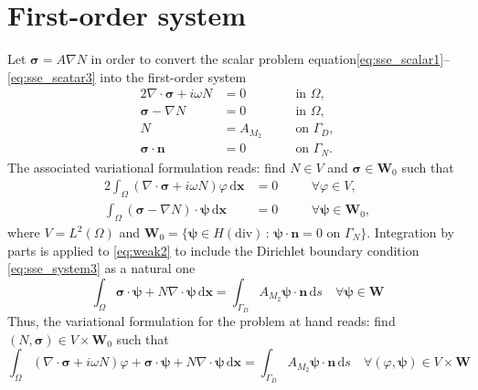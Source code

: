 \documentclass[11pt,a4paper]{article}
\begin{document}
\section*{First-order system}
Let $\boldsymbol{\sigma}=A\nabla N$ in order to convert the scalar problem equation\eqref{eq:sse_scalar1}--\eqref{eq:sse_scatar3} into the first-order system
\begin{alignat}{2}
\nabla\cdot\boldsymbol{\sigma}+i\omega N&=0  \quad && \text{in } \Omega,
\label{eq:sse_system1}\\
\boldsymbol{\sigma}-\nabla N&=0 \quad && \text{in } \Omega,\\
N&=A_{M_2} \quad && \text{on } \Gamma_D,
\label{eq:sse_system3}\\
\boldsymbol{\sigma}\cdot\mathbf{n}&=0 \quad && \text{on } \Gamma_N.
\label{eq:sse_system4}
\end{alignat}
The associated variational formulation reads: find $N\in V$ and $\boldsymbol{\sigma}\in\mathbf{W}_0$ such that 
\begin{alignat}{2}
\int_\Omega\left(\nabla\cdot\boldsymbol{\sigma}+i\omega N\right)\varphi\,\mathrm{d}\mathbf{x}&=0 \quad && \forall \varphi\in V,
\label{eq:weak1}\\
\int_\Omega\left(\boldsymbol{\sigma}-\nabla N\right)\cdot\boldsymbol{\psi}\,\mathrm{d}\mathbf{x}&=0 \quad && \forall \boldsymbol{\psi}\in \mathbf{W}_0,
\label{eq:weak2}
\end{alignat}
where $V=L^2(\Omega)$ and $\mathbf{W}_0=\{\boldsymbol{\psi}\in H(\text{div})\,:\,\boldsymbol{\psi}\cdot\mathbf{n}=0 \text{ on }\Gamma_N\}$.
Integration by parts is applied to \eqref{eq:weak2} to include the Dirichlet boundary condition \eqref{eq:sse_system3} as a natural one
\begin{equation}
\int_\Omega\boldsymbol{\sigma}\cdot\boldsymbol{\psi}+N\nabla\cdot\boldsymbol{\psi}\,\mathrm{d}\mathbf{x}=\int_{\Gamma_D} A_{M_2}\boldsymbol{\psi}\cdot\mathbf{n}\,\mathrm{d}s \quad \forall \boldsymbol{\psi}\in \mathbf{W}
\end{equation}
Thus, the variational formulation for the problem at hand reads: find $(N,\boldsymbol{\sigma})\in V\times\mathbf{W}_0$ such that
\begin{equation}
\int_\Omega\left(\nabla\cdot\boldsymbol{\sigma}+i\omega N\right)\varphi+\boldsymbol{\sigma}\cdot\boldsymbol{\psi}+N\nabla\cdot\boldsymbol{\psi}\,\mathrm{d}\mathbf{x}=\int_{\Gamma_D} A_{M_2}\boldsymbol{\psi}\cdot\mathbf{n}\,\mathrm{d}s \quad \forall (\varphi,\boldsymbol{\psi})\in V\times\mathbf{W}
\end{equation}
\end{document}
